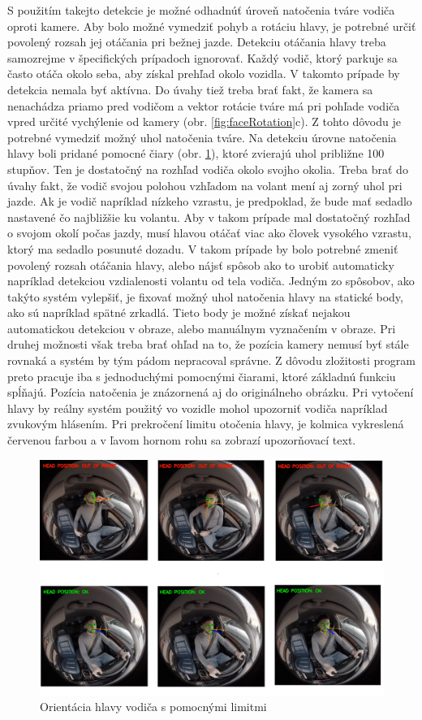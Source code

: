 \documentclass[slovak,master,dept460,male,cpp,cpdeclaration]{diploma}
\begin{document}
S použitím takejto detekcie je možné odhadnúť úroveň natočenia tváre vodiča oproti kamere. Aby bolo možné vymedziť pohyb a rotáciu hlavy, je potrebné určiť povolený rozsah jej otáčania pri bežnej jazde. Detekciu otáčania hlavy treba  samozrejme v špecifických prípadoch ignorovať. Každý vodič, ktorý parkuje sa často otáča okolo seba, aby získal prehľad okolo vozidla. V takomto prípade  by detekcia  nemala byť aktívna. Do úvahy tiež treba brať fakt, že kamera sa nenachádza priamo pred vodičom a vektor rotácie tváre má  pri pohľade vodiča vpred určité vychýlenie od kamery (obr. \ref{fig:faceRotation}c). Z tohto dôvodu je potrebné  vymedziť  možný uhol natočenia tváre. Na detekciu úrovne natočenia hlavy boli pridané  pomocné čiary (obr. \ref{fig:headLimits}), ktoré zvierajú uhol približne 100 stupňov. Ten je dostatočný na rozhľad vodiča okolo svojho okolia. Treba brať do úvahy fakt, že vodič svojou polohou vzhľadom na volant mení aj zorný uhol pri jazde. Ak je vodič napríklad nízkeho vzrastu, je predpoklad, že bude mať sedadlo nastavené čo najbližšie ku volantu. Aby v takom prípade mal dostatočný rozhľad o svojom okolí počas jazdy, musí hlavou otáčať viac ako človek vysokého vzrastu, ktorý ma sedadlo posunuté dozadu. V takom prípade by bolo potrebné zmeniť povolený rozsah otáčania hlavy, alebo nájsť spôsob ako to urobiť automaticky napríklad detekciou vzdialenosti volantu od tela vodiča. Jedným zo spôsobov, ako takýto systém vylepšiť, je fixovať možný uhol natočenia hlavy na statické body, ako sú napríklad spätné zrkadlá. Tieto body je možné získať nejakou automatickou detekciou v obraze, alebo manuálnym vyznačením v obraze. Pri druhej možnosti však treba brať ohľad na to, že pozícia kamery nemusí byť stále rovnaká a systém by tým pádom nepracoval správne. Z dôvodu zložitosti program preto pracuje iba s jednoduchými pomocnými čiarami, ktoré základnú funkciu  spĺňajú.  Pozícia natočenia  je znázornená aj do originálneho obrázku. Pri vytočení hlavy by reálny systém použitý vo vozidle mohol upozorniť vodiča napríklad zvukovým hlásením. Pri prekročení limitu otočenia hlavy, je kolmica vykreslená červenou farbou a v ľavom hornom rohu sa zobrazí upozorňovací text.

\begin{figure}[H]
	\centering
	\includegraphics[width=1\textwidth]{Figures/headLimits1.png}
	\caption{Orientácia hlavy vodiča s pomocnými limitmi}
	\label{fig:headLimits}
\end{figure}
\end{document}
